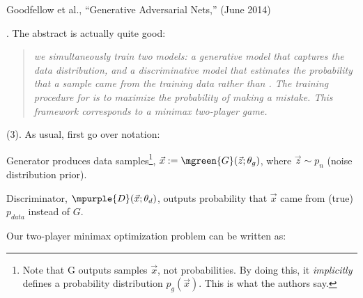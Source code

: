 \documentclass[11pt]{article}
\begin{document}
\vspace{-1em}
{\footnotesize Goodfellow et al., ``Generative Adversarial Nets,'' (June 2014)}

\p {}. The abstract is actually quite good:
\begin{quote}
	\vspace{-1em}
	\small\itshape
	\textellipsis we simultaneously train two models: a generative model  that captures the data distribution, and a discriminative model  that estimates the probability that a sample came from the training data rather than . The training procedure for  is to maximize the probability of  making a mistake. This framework corresponds to a minimax two-player game.
\end{quote}

\myspace
\p {} (3). As usual, first go over notation:
\begin{compactitem}
	\item Generator produces data samples\footnote{Note that G outputs samples $\vec x$, not probabilities. By doing this, it \textit{implicitly} defines a probability distribution $p_g(\vec x)$. This is what the authors say.}, $\vec x := \mgreen{G}(\vec z; \theta_g)$, where $\vec z \sim p_n$ (noise distribution prior). 
	
	\item Discriminator, $\mpurple{D}(\vec x; \theta_d)$, outputs probability that $\vec x$ came from (true) $p_{data}$ instead of $G$.  
\end{compactitem}
Our two-player minimax optimization problem can be written as:
\newcommand{\md}{\mpurple{D}}
\newcommand{\mg}{\mgreen{G}}
\graybox{
	\mgreen{\min_G} \mpurple{\max_D} V(\md, \mg) 
	&= \mpurple{ \E[\vec x \sim p_{data}]{\log D(\vec x)} } 
	+ \E[\vec z \sim p_n]{\log \left( 1 - \md ( \mg (\vec z) )  \right) } \label{eq:gans-1}
}
\end{document}
